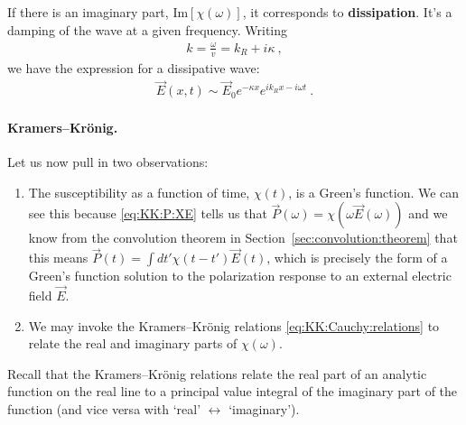 If there is an imaginary part, $\text{Im}[\chi(\omega)]$, it corresponds to \textbf{dissipation}. It's a damping of the wave at a given frequency. Writing
\begin{align}
	k = \frac{\omega}{v} = k_R + i \kappa \ ,
\end{align}
we have the expression for a dissipative wave:
\begin{align}
	\vec E(x,t) \sim \vec{E}_0 e^{-\kappa x} e^{ik_Rx - i\omega t} \ .
\end{align}

\paragraph{Kramers--Kr\"onig.} Let us now pull in two observations:
\begin{enumerate}
\item The susceptibility as a function of time, $\chi(t)$, is a Green's function. We can see this because \eqref{eq:KK:P:XE} tells us that $\vec{P}(\omega) = \chi(\omega \vec{E}(\omega))$ and we know from the convolution theorem in Section~\ref{sec:convolution:theorem} that this means $\vec{P}(t) = \int dt' \chi(t-t')\vec{E}(t)$, which is precisely the form of a Green's function solution to the polarization response to an external electric field $\vec{E}$.
\item We may invoke the Kramers--Kr\"onig relations \eqref{eq:KK:Cauchy:relations} to relate the real and imaginary parts of $\chi(\omega)$.
\end{enumerate}
Recall that the Kramers--Kr\"onig relations relate the real part of an analytic function on the real line to a principal value integral of the imaginary part of the function (and vice versa with `real' $\leftrightarrow$ `imaginary'). 

